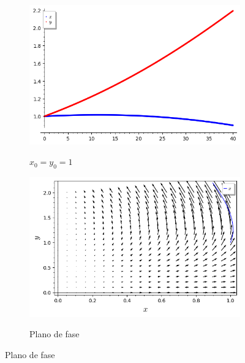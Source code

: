 \begin{figure}[H]
    \centering
    \begin{subfigure}{0.4\textwidth}
        \includegraphics[scale=0.48]{figuras/LV_7.png}
        \label{fig:LV_7}
        \caption{$x_0 = y_0 = 1$}
    \end{subfigure}
    \begin{subfigure}{0.4\textwidth}
        \includegraphics[scale=0.48]{figuras/LV_8.png}
        \label{fig:LV_8}
        \caption{Plano de fase}
    \end{subfigure}
\end{figure}

